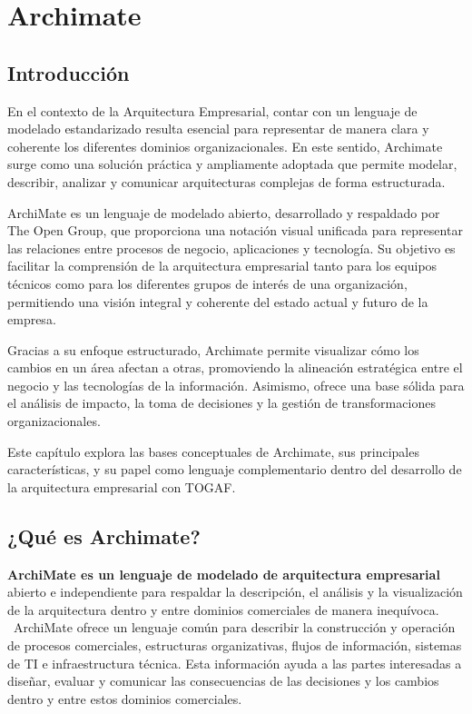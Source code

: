 \graphicspath{{./1-Proyecto/capitulo2/}}

\chapter{Archimate}{
    \section{Introducción}
    En el contexto de la Arquitectura Empresarial, contar con un lenguaje de modelado estandarizado resulta esencial para representar de manera clara y coherente los diferentes dominios organizacionales. En este sentido, Archimate surge como una solución práctica y ampliamente adoptada que permite modelar, describir, analizar y comunicar arquitecturas complejas de forma estructurada.

    ArchiMate es un lenguaje de modelado abierto, desarrollado y respaldado por The Open Group, que proporciona una notación visual unificada para representar las relaciones entre procesos de negocio, aplicaciones y tecnología. Su objetivo es facilitar la comprensión de la arquitectura empresarial tanto para los equipos técnicos como para los diferentes grupos de interés de una organización, permitiendo una visión integral y coherente del estado actual y futuro de la empresa.

    Gracias a su enfoque estructurado, Archimate permite visualizar cómo los cambios en un área afectan a otras, promoviendo la alineación estratégica entre el negocio y las tecnologías de la información. Asimismo, ofrece una base sólida para el análisis de impacto, la toma de decisiones y la gestión de transformaciones organizacionales.

    Este capítulo explora las bases conceptuales de Archimate, sus principales características, y su papel como lenguaje complementario dentro del desarrollo de la arquitectura empresarial con TOGAF.
	\section{¿Qué es Archimate?}
    \textbf{ArchiMate es un lenguaje de modelado de arquitectura empresarial} abierto e independiente para respaldar la descripción, el análisis y la visualización de la arquitectura dentro y entre dominios comerciales de manera inequívoca.\\\
    ArchiMate ofrece un lenguaje común para describir la construcción y operación de procesos comerciales, estructuras organizativas, flujos de información, sistemas de TI e infraestructura técnica. Esta información ayuda a las partes interesadas a diseñar, evaluar y comunicar las consecuencias de las decisiones y los cambios dentro y entre estos dominios comerciales. \cite{Archimate_definition}
}
